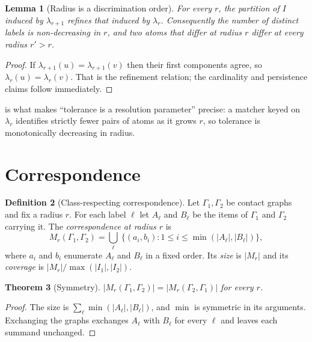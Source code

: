\documentclass[11pt,twocolumn,a4paper]{article}
\theoremstyle{scthm}
\newtheorem{theorem}{Theorem}[section]
\newtheorem{lemma}[theorem]{Lemma}
\theoremstyle{definition}
\newtheorem{definition}[theorem]{Definition}
\theoremstyle{remark}
\newcommand{\Gph}{\Gamma}
\newcommand{\lab}{\lambda}
\newcommand{\abs}[1]{\lvert#1\rvert}
\begin{document}
\begin{lemma}[Radius is a discrimination order]
\label{lem:radius-order}
For every $r$, the partition of $I$ induced by $\lab_{r+1}$ refines that
induced by $\lab_r$. Consequently the number of distinct labels is
non-decreasing in $r$, and two atoms that differ at radius $r$ differ at
every radius $r'>r$.
\end{lemma}

\begin{proof}
If $\lab_{r+1}(u)=\lab_{r+1}(v)$ then their first components agree, so
$\lab_r(u)=\lab_r(v)$. That is the refinement relation; the cardinality
and persistence claims follow immediately.
\end{proof}

 is what makes ``tolerance is a resolution
parameter'' precise: a matcher keyed on $\lab_r$ identifies strictly fewer
pairs of atoms as it grows $r$, so tolerance is monotonically decreasing
in radius.

\section{Correspondence}
\label{sec:correspondence}

\begin{definition}[Class-respecting correspondence]
\label{def:corr}
Let $\Gph_1,\Gph_2$ be contact graphs and fix a radius $r$. For each
label $\ell$ let $A_\ell$ and $B_\ell$ be the items of $\Gph_1$ and
$\Gph_2$ carrying it. The \emph{correspondence at radius $r$} is
\[
M_r(\Gph_1,\Gph_2)=\bigcup_{\ell}\ \bigl\{(a_i,b_i): 1\le i\le
\min(\abs{A_\ell},\abs{B_\ell})\bigr\},
\]
where $a_i$ and $b_i$ enumerate $A_\ell$ and $B_\ell$ in a fixed order.
Its \emph{size} is $\abs{M_r}$ and its \emph{coverage} is
$\abs{M_r}/\max(\abs{I_1},\abs{I_2})$.
\end{definition}

\begin{theorem}[Symmetry]
\label{thm:symmetry}
$\abs{M_r(\Gph_1,\Gph_2)}=\abs{M_r(\Gph_2,\Gph_1)}$ for every $r$.
\end{theorem}

\begin{proof}
The size is $\sum_\ell \min(\abs{A_\ell},\abs{B_\ell})$, and $\min$ is
symmetric in its arguments. Exchanging the graphs exchanges $A_\ell$ with
$B_\ell$ for every $\ell$ and leaves each summand unchanged.
\end{proof}
\end{document}

